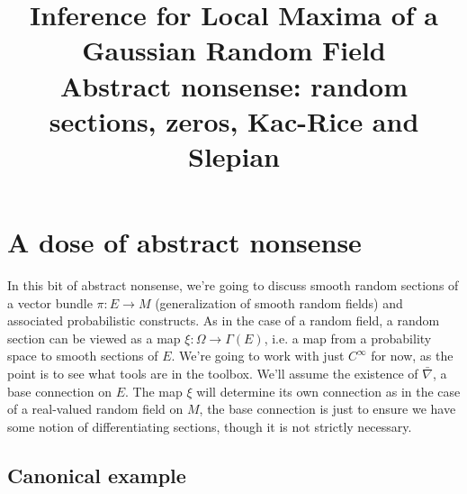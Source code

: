 \documentclass{article}
\title{ {\bf Inference for Local Maxima of a Gaussian Random Field} \\ Abstract nonsense: random sections, zeros, Kac-Rice and Slepian}
\newcommand{\randsec}{\xi}
\begin{document}
	\maketitle
	\RaggedRight

\section{A dose of abstract nonsense}

In this bit of abstract nonsense, we're going to discuss smooth random
sections of a vector bundle $\pi:E \to M$ (generalization of smooth random
fields) and associated probabilistic constructs. As in the case of a random field, a random section can
be viewed as a map $\randsec:\Omega \to \Gamma(E)$, i.e. a map from a probability space to smooth sections of $E$.
We're going to work with just $C^{\infty}$ for now, as the point is to see what tools are in the toolbox.
We'll assume the existence of $\bar{\nabla}$, a base connection on $E$. The map $\randsec$ will determine
its own connection as in the case of a real-valued random field on $M$, the base connection is just to
ensure we have some notion of differentiating sections, though it is not strictly necessary.

\subsection{Canonical example}
\end{document}
